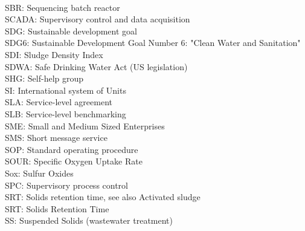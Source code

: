 \documentclass{article}
\begin{document}
\vspace{0.3cm}\\
SBR:  Sequencing batch reactor
\vspace{0.3cm}\\
SCADA:  Supervisory control and data acquisition
\vspace{0.3cm}\\
SDG:  Sustainable development goal
\vspace{0.3cm}\\
SDG6:  Sustainable Development Goal Number 6: "Clean Water and Sanitation"
\vspace{0.3cm}\\
SDI:  Sludge Density Index
\vspace{0.3cm}\\
SDWA:  Safe Drinking Water Act (US legislation)
\vspace{0.3cm}\\
SHG:  Self-help group
\vspace{0.3cm}\\
SI:  International system of Units
\vspace{0.3cm}\\
SLA:  Service-level agreement
\vspace{0.3cm}\\
SLB:  Service-level benchmarking
\vspace{0.3cm}\\
SME:  Small and Medium Sized Enterprises
\vspace{0.3cm}\\
SMS:  Short message service
\vspace{0.3cm}\\
SOP:  Standard operating procedure
\vspace{0.3cm}\\
SOUR:  Specific Oxygen Uptake Rate
\vspace{0.3cm}\\
Sox:  Sulfur Oxides
\vspace{0.3cm}\\
SPC:  Supervisory process control
\vspace{0.3cm}\\
SRT:  Solids retention time, see also Activated sludge
\vspace{0.3cm}\\
SRT:  Solids Retention Time
\vspace{0.3cm}\\
SS:  Suspended Solids (wastewater treatment)
\vspace{0.3cm}\\
\end{document}
